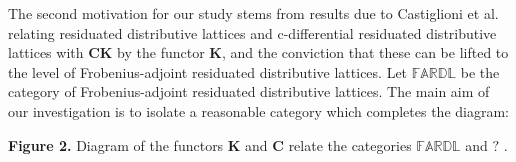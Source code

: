 \documentclass[final,12pt,times]{elsarticle}
\theoremstyle{plain}
\theoremstyle{definition}
\theoremstyle{break}
\begin{document}
The second motivation for our study stems from results due to Castiglioni et al. relating residuated distributive lattices and  c-differential residuated distributive lattices with $\mathbf{CK}$ by the functor $\mathbf{K}$, and the conviction that these can be lifted to the level of Frobenius-adjoint residuated distributive lattices. Let $\mathbb{FARDL}$ be the category of Frobenius-adjoint residuated distributive lattices. The main aim of our investigation is to isolate a reasonable category which completes the diagram:
\begin{center}
\begin{center}  {\bf{Figure 2.}} Diagram of the functors $\mathbf{K}$ and $\mathbf{C}$ relate the categories $\mathbb{FARDL}$ and $\mathbb{?}$ .
\end{center}
\end{center}
\end{document}
